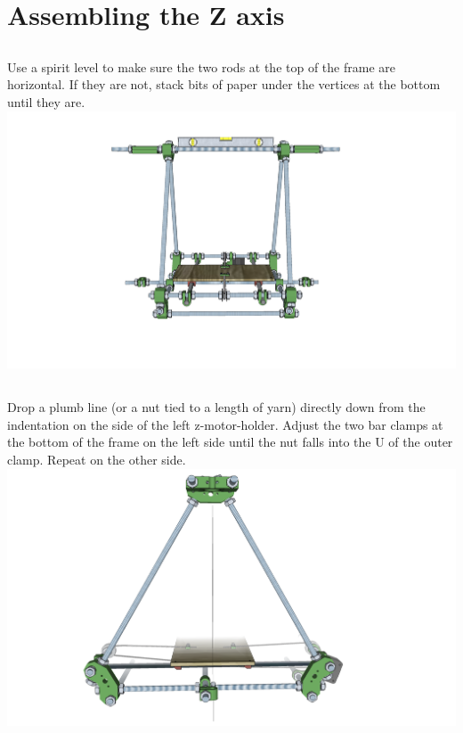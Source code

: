 \documentclass[twoside,a4paper,titlepage]{memoir}
\begin{document}
	\chapter{Assembling the Z axis}
	
	\section{}
	Use a spirit level to make sure the two rods at the top of the frame are horizontal. If they are not, stack
	bits of paper under the vertices at the bottom until they are.\\
	\includegraphics[width=1\linewidth]{graphics/ch8_1.png}

	\section{}
	Drop a plumb line (or a nut tied to a length of yarn) directly down from the indentation on the side of the
	left z-motor-holder. Adjust the two bar clamps at the bottom of the frame on the left side until the nut
	falls into the U of the outer clamp. Repeat on the other side.\\
	\includegraphics[width=1\linewidth]{graphics/ch8_2.png}
	
\end{document}
